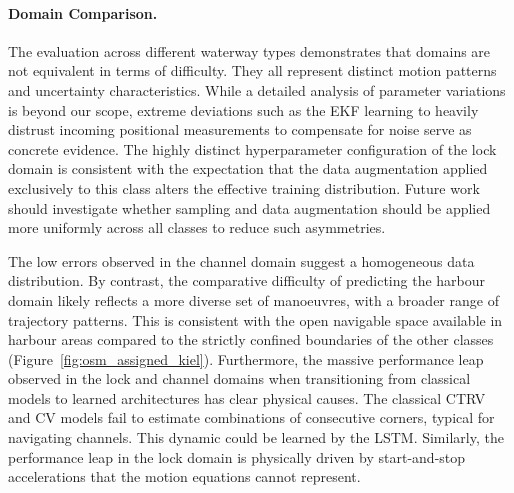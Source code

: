 \paragraph{Domain Comparison.} %
The evaluation across different waterway types demonstrates that domains are not equivalent in terms of difficulty.
They all represent distinct motion patterns and uncertainty characteristics.
While a detailed analysis of parameter variations is beyond our scope, extreme deviations such as the \ac{EKF} learning to heavily distrust incoming positional measurements to compensate for noise serve as concrete evidence. %
The highly distinct hyperparameter configuration of the lock domain is consistent with the expectation that the data augmentation applied exclusively to this class alters the effective training distribution. 
Future work should investigate whether sampling and data augmentation should be applied more uniformly across all classes to reduce such asymmetries. %

The low errors observed in the channel domain suggest a homogeneous data distribution.
By contrast, the comparative difficulty of predicting the harbour domain likely reflects a more diverse set of manoeuvres, with a %
broader range of trajectory patterns.
This is consistent with the open navigable space available in harbour areas compared to the strictly confined boundaries of the other classes (Figure~\ref{fig:osm_assigned_kiel}).
Furthermore, the massive performance leap observed in the lock and channel domains when transitioning from classical models to learned architectures has clear physical causes.
The classical \ac{CTRV} and \ac{CV} models fail to estimate combinations of consecutive corners, typical for navigating channels. This dynamic could be learned by the \ac{LSTM}.
Similarly, the performance leap in the lock domain is physically driven by start-and-stop accelerations that the motion equations cannot represent.



